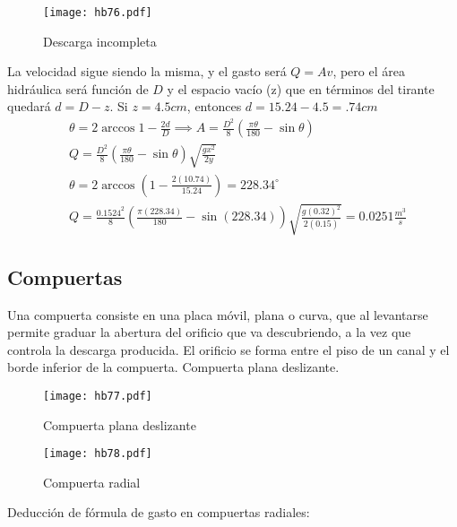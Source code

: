 \begin{figure}[h!]
    \centering
      \texttt{[image: hb76.pdf]}
      \caption{Descarga incompleta}
      \label{hb76}
    \end{figure}
La velocidad sigue siendo la misma, y el gasto será $Q=Av$, pero el área hidráulica será función de $D$ y el espacio vacío (z) que en términos del tirante quedará $d=D-z$. Si $z=4.5cm$, entonces $d=15.24-4.5=.74cm$
\begin{align*}
    &\theta = 2\arccos{1 - \frac{2d}{D}}\implies A = \frac{D^2}{8}\left(\frac{\pi\theta}{180} -\sin{\theta}\right)\\ 
    &Q = \frac{D^2}{8}\left(\frac{\pi\theta}{180} -\sin{\theta}\right) \sqrt{\frac{gx^2}{2y}}\\
    &\theta = 2\arccos{\left(1 -\frac{2(10.74)}{15.24}\right)}= 228.34^{\circ}\\ 
    &Q = \frac{0.1524^2}{8}\left(\frac{\pi(228.34)}{180} -\sin{(228.34)}\right) \sqrt{\frac{g(0.32)^2}{2(0.15)}} = 0.0251 \frac{m^3}{s}
\end{align*}

\subsection{Compuertas}
Una compuerta consiste en una placa móvil, plana o curva, que al levantarse permite graduar la abertura del orificio que va descubriendo, a la vez que controla la descarga producida. El orificio se forma entre el piso de un canal y el borde inferior de la compuerta. Compuerta plana deslizante.

\begin{figure}[h!]
\centering
  \texttt{[image: hb77.pdf]}
  \caption{Compuerta plana deslizante}
  \label{hb77}
\end{figure}

\begin{figure}[h!]
    \centering
      \texttt{[image: hb78.pdf]}
      \caption{Compuerta radial}
      \label{hb78}
\end{figure}

Deducción de fórmula de gasto en compuertas radiales:

